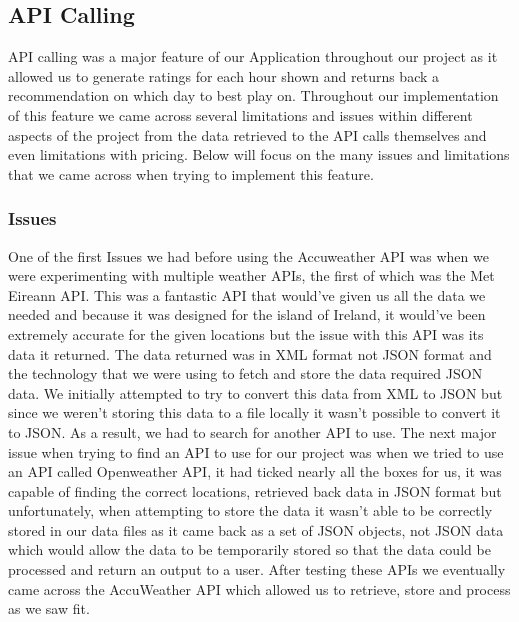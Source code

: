 \subsection{API Calling}
API calling was a major feature of our Application throughout our project as it allowed us to generate ratings for each hour shown and returns back a recommendation on which day to best play on.
\newline
\newline
Throughout our implementation of this feature we came across several \newline limitations and issues within different aspects of the project from the data retrieved to the API calls themselves and even limitations with pricing. 
\newline
\newline
Below will focus on the many issues and limitations that we came across when trying to implement this feature.

\subsubsection{Issues}
One of the first Issues we had before using the Accuweather API was when we were experimenting with multiple weather APIs, the first of which was the Met Eireann API\cite{ref15}. This was a fantastic API that would've given us all the data we needed and because it was designed for the island of Ireland, it would've been extremely accurate for the given locations but the issue with this API was its data it returned.
\newline
\newline
The data returned was in XML format not JSON format and the technology that we were using to fetch and store the data required JSON data. We initially attempted to try to convert this data from XML to JSON but since we weren't storing this data to a file locally it wasn't possible to convert it to JSON. As a result, we had to search for another API to use.
\newline
\newline
The next major issue when trying to find an API to use for our project was when we tried to use an API called Openweather API\cite{ref16}, it had ticked nearly all the boxes for us, it was capable of finding the correct locations, retrieved back data in JSON format but unfortunately, when attempting to store the data it wasn't able to be correctly stored in our data files as it came back as a set of JSON objects, not JSON data which would allow the data to be temporarily stored so that the data could be processed and return an output to a user. After testing these APIs we eventually came across the AccuWeather API which allowed us to retrieve, store and process as we saw fit.

